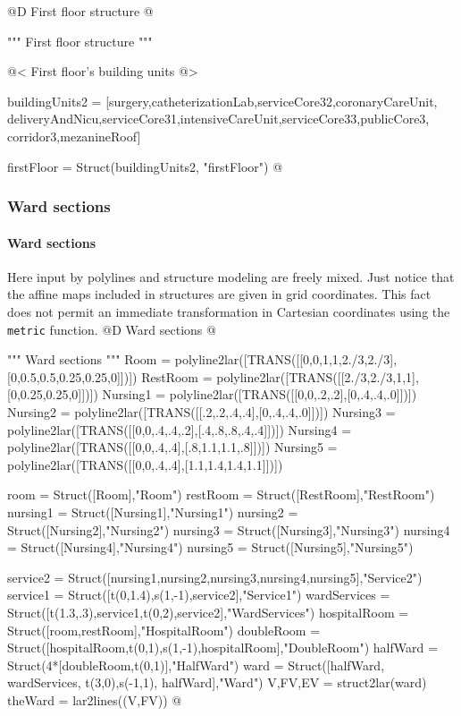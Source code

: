 \documentclass[11pt,oneside]{article}    %
\begin{document}
@D First floor structure
@{""" First floor structure """

@< First floor's building units @>

buildingUnits2 = [surgery,catheterizationLab,serviceCore32,coronaryCareUnit,
    deliveryAndNicu,serviceCore31,intensiveCareUnit,serviceCore33,publicCore3,
    corridor3,mezanineRoof]
    
firstFloor = Struct(buildingUnits2, "firstFloor")
@}


\subsubsection{Ward sections}
\paragraph{Ward sections}
Here input by polylines and structure modeling are freely mixed. Just notice that
the affine maps included in structures are given in grid coordinates. This fact 
does not permit an immediate transformation in Cartesian coordinates using the \texttt{metric}
function.
@D Ward sections
@{""" Ward sections """
Room = polyline2lar([TRANS([[0,0,1,1,2./3,2./3],[0,0.5,0.5,0.25,0.25,0]])])
RestRoom = polyline2lar([TRANS([[2./3,2./3,1,1],[0,0.25,0.25,0]])])
Nursing1 = polyline2lar([TRANS([[0,0,.2,.2],[0,.4,.4,.0]])])
Nursing2 = polyline2lar([TRANS([[.2,.2,.4,.4],[0,.4,.4,.0]])])
Nursing3 = polyline2lar([TRANS([[0,0,.4,.4,.2],[.4,.8,.8,.4,.4]])])
Nursing4 = polyline2lar([TRANS([[0,0,.4,.4],[.8,1.1,1.1,.8]])])
Nursing5 = polyline2lar([TRANS([[0,0,.4,.4],[1.1,1.4,1.4,1.1]])])

room = Struct([Room],"Room")
restRoom = Struct([RestRoom],"RestRoom")
nursing1 = Struct([Nursing1],"Nursing1")
nursing2 = Struct([Nursing2],"Nursing2")
nursing3 = Struct([Nursing3],"Nursing3")
nursing4 = Struct([Nursing4],"Nursing4")
nursing5 = Struct([Nursing5],"Nursing5")

service2 = Struct([nursing1,nursing2,nursing3,nursing4,nursing5],"Service2")
service1 = Struct([t(0,1.4),s(1,-1),service2],"Service1")
wardServices = Struct([t(1.3,.3),service1,t(0,2),service2],"WardServices")
hospitalRoom = Struct([room,restRoom],"HospitalRoom")
doubleRoom =  Struct([hospitalRoom,t(0,1),s(1,-1),hospitalRoom],"DoubleRoom")
halfWard = Struct(4*[doubleRoom,t(0,1)],"HalfWard")
ward = Struct([halfWard, wardServices, t(3,0),s(-1,1), halfWard],"Ward")
V,FV,EV = struct2lar(ward)
theWard = lar2lines((V,FV))
@}
\end{document}
